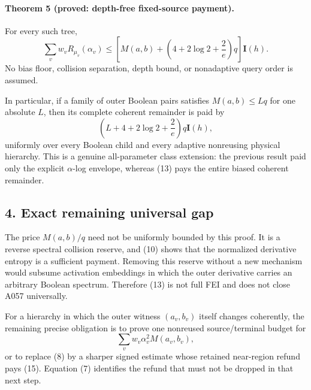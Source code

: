 \paragraph{Theorem 5 (proved: depth-free fixed-source payment).}
For every such tree,
\[
 \boxed{
 \sum_vw_vR_{\mu_v}(\alpha_v)
 \le\left[M(a,b)+\left(4+2\log2+\frac2e\right)q\right]\mathbf I(h).} \tag{13}
\]
No bias floor, collision separation, depth bound, or nonadaptive query
order is assumed.

In particular, if a family of outer Boolean pairs satisfies
\(M(a,b)\le Lq\) for one absolute \(L\), then its complete coherent
remainder is paid by
\[
 \left(L+4+2\log2+\frac2e\right)q\mathbf I(h),                       \tag{14}
\]
uniformly over every Boolean child and every adaptive nonreusing
physical hierarchy.  This is a genuine all-parameter class extension:
the previous result paid only the explicit \(\alpha\)-log envelope,
whereas (13) pays the entire biased coherent remainder.

\subsection*{4. Exact remaining universal gap}

The price \(M(a,b)/q\) need not be uniformly bounded by this proof.
It is a reverse spectral collision reserve, and (10) shows that the
normalized derivative entropy is a sufficient payment.  Removing this
reserve without a new mechanism would subsume activation embeddings in
which the outer derivative carries an arbitrary Boolean spectrum.
Therefore (13) is not full FEI and does not close A057 universally.

For a hierarchy in which the outer witness \((a_v,b_v)\) itself changes
coherently, the remaining precise obligation is to prove one nonreused
source/terminal budget for
\[
 \sum_vw_v\alpha_v^2M(a_v,b_v),                                     \tag{15}
\]
or to replace (8) by a sharper signed estimate whose retained near-region
refund pays (15).  Equation (7) identifies the refund that must not be
dropped in that next step.

